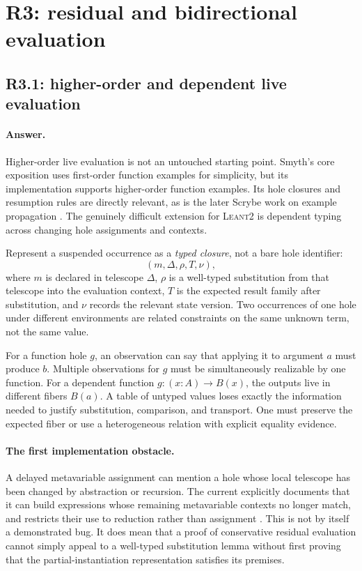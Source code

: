 \documentclass[11pt,a4paper]{article}
\newcommand{\code}[1]{\texttt{\detokenize{#1}}}
\newcommand{\repo}{\textsc{Leant2}}
\newcommand{\answer}{\paragraph{Answer.}}
\theoremstyle{definition}
\theoremstyle{remark}
\begin{document}
\section{R3: residual and bidirectional evaluation}
\label{sec:r3}

\subsection{R3.1: higher-order and dependent live evaluation}
\answer Higher-order live evaluation is not an untouched starting point.
Smyth's core exposition uses first-order function examples for simplicity, but
its implementation supports higher-order function examples. Its hole closures
and resumption rules are directly relevant, as is the later Scrybe work on
example propagation \cite{smyth,scrybe}. The genuinely difficult extension for
\repo{} is dependent typing across changing hole assignments and contexts.

Represent a suspended occurrence as a \emph{typed closure}, not a bare hole
identifier:
\[
 (m,\Delta,\rho,T,\nu),
\]
where $m$ is declared in telescope $\Delta$, $\rho$ is a well-typed substitution
from that telescope into the evaluation context, $T$ is the expected result
family after substitution, and $\nu$ records the relevant state version. Two
occurrences of one hole under different environments are related constraints
on the same unknown term, not the same value.

For a function hole $g$, an observation can say that applying it to argument
$a$ must produce $b$. Multiple observations for $g$ must be simultaneously
realizable by one function. For a dependent function
$g:(x:A)\to B(x)$, the outputs live in different fibers $B(a)$. A table of
untyped values loses exactly the information needed to justify substitution,
comparison, and transport. One must preserve the expected fiber or use a
heterogeneous relation with explicit equality evidence.

\paragraph{The first implementation obstacle.}
A delayed metavariable assignment can mention a hole whose local telescope has
been changed by abstraction or recursion. The current
\code{instantiatePartial} explicitly documents that it can build expressions
whose remaining metavariable contexts no longer match, and restricts their use
to reduction rather than assignment \cite{repo}. This is not by itself a
demonstrated bug. It does mean that a proof of conservative residual evaluation
cannot simply appeal to a well-typed substitution lemma without first proving
that the partial-instantiation representation satisfies its premises.
\end{document}
